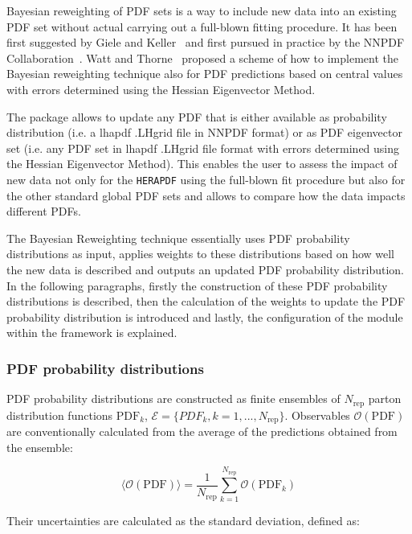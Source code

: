 Bayesian reweighting of PDF sets is a way to include new data into an existing PDF set without actual carrying out a full-blown fitting procedure. It has been first suggested by Giele and Keller~\cite{Giele:1998gw} and first pursued in practice by the NNPDF Collaboration~\cite{Ball:2011gg,Ball:2010gb}. Watt and Thorne~\cite{Watt:2012tq} proposed a scheme of how to implement the Bayesian reweighting technique also for PDF predictions based on central values with errors determined using the Hessian Eigenvector Method. 

The \fitter package allows to update any PDF that is either available as probability distribution (i.e. a lhapdf .LHgrid file in NNPDF format) or as PDF eigenvector set (i.e. any PDF set in lhapdf .LHgrid file format with errors determined using the Hessian Eigenvector Method). This enables the user to assess the impact of new data not only for the {\tt HERAPDF} using the full-blown fit procedure but also for the other standard global PDF sets and allows to compare how the data impacts different PDFs.

The Bayesian Reweighting technique essentially uses PDF probability distributions as input, applies weights to these distributions based on how well the new data is described and outputs an updated PDF probability distribution. In the following paragraphs, firstly the construction of these PDF probability distributions is described, then the calculation of the weights to update the PDF probability distribution is introduced and lastly, the configuration of the module within the \fitter framework is explained.

\subsubsection{PDF probability distributions}

PDF probability distributions are constructed as finite ensembles of $N_{\mathrm{rep}}$ parton distribution functions $\mathrm{PDF}_k$, $\mathcal{E} = \{PDF_k, k = 1, . . . ,N_{\mathrm{rep}}\}$. Observables $\mathcal{O}(\mathrm{PDF})$ are conventionally calculated from the average of the predictions obtained from the ensemble:

\begin{equation}
 \langle\mathcal{O}(\mathrm{PDF})\rangle = \frac{1}{N_{\mathrm{rep}}} \sum_{k=1}^{N_{\mathrm{rep}}} \mathcal{O}(\mathrm{PDF}_k)
\label{eq:meanReplicas}
\end{equation}
 
Their uncertainties are calculated as the standard deviation, defined as:

